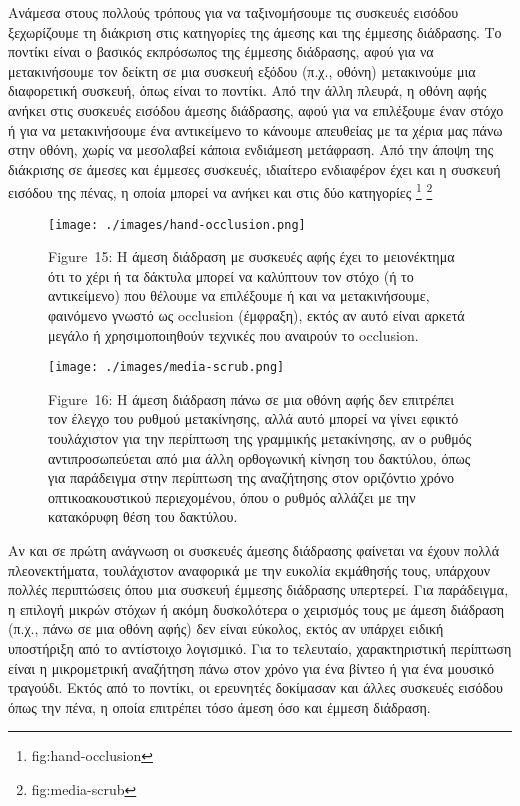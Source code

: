 \documentclass[
]{article}
\begin{document}
Ανάμεσα στους πολλούς τρόπους για να ταξινομήσουμε τις συσκευές εισόδου
ξεχωρίζουμε τη διάκριση στις κατηγορίες της άμεσης και της έμμεσης
διάδρασης. Το ποντίκι είναι ο βασικός εκπρόσωπος της έμμεσης διάδρασης,
αφού για να μετακινήσουμε τον δείκτη σε μια συσκευή εξόδου (π.χ., οθόνη)
μετακινούμε μια διαφορετική συσκευή, όπως είναι το ποντίκι. Από την άλλη
πλευρά, η οθόνη αφής ανήκει στις συσκευές εισόδου άμεσης διάδρασης, αφού
για να επιλέξουμε έναν στόχο ή για να μετακινήσουμε ένα αντικείμενο το
κάνουμε απευθείας με τα χέρια μας πάνω στην οθόνη, χωρίς να μεσολαβεί
κάποια ενδιάμεση μετάφραση. Από την άποψη της διάκρισης σε άμεσες και
έμμεσες συσκευές, ιδιαίτερο ενδιαφέρον έχει και η συσκευή εισόδου της
πένας, η οποία μπορεί να ανήκει και στις δύο κατηγορίες \footnote{fig:hand-occlusion}
\footnote{fig:media-scrub}

\leavevmode{}%
\begin{figure}
\hypertarget{fig:hand-occlusion}{%
\centering
\texttt{[image: ./images/hand-occlusion.png]}
\caption{Figure~15: Η άμεση διάδραση με συσκευές αφής έχει το
μειονέκτημα ότι το χέρι ή τα δάκτυλα μπορεί να καλύπτουν τον στόχο (ή το
αντικείμενο) που θέλουμε να επιλέξουμε ή και να μετακινήσουμε, φαινόμενο
γνωστό ως occlusion (έμφραξη), εκτός αν αυτό είναι αρκετά μεγάλο ή
χρησιμοποιηθούν τεχνικές που αναιρούν το
occlusion.}\label{fig:hand-occlusion}
}
\end{figure}

\leavevmode{}%
\begin{figure}
\hypertarget{fig:media-scrub}{%
\centering
\texttt{[image: ./images/media-scrub.png]}
\caption{Figure~16: Η άμεση διάδραση πάνω σε μια οθόνη αφής δεν
επιτρέπει τον έλεγχο του ρυθμού μετακίνησης, αλλά αυτό μπορεί να γίνει
εφικτό τουλάχιστον για την περίπτωση της γραμμικής μετακίνησης, αν ο
ρυθμός αντιπροσωπεύεται από μια άλλη ορθογωνική κίνηση του δακτύλου,
όπως για παράδειγμα στην περίπτωση της αναζήτησης στον οριζόντιο χρόνο
οπτικοακουστικού περιεχομένου, όπου ο ρυθμός αλλάζει με την κατακόρυφη
θέση του δακτύλου.}\label{fig:media-scrub}
}
\end{figure}

Αν και σε πρώτη ανάγνωση οι συσκευές άμεσης διάδρασης φαίνεται να έχουν
πολλά πλεονεκτήματα, τουλάχιστον αναφορικά με την ευκολία εκμάθησής
τους, υπάρχουν πολλές περιπτώσεις όπου μια συσκευή έμμεσης διάδρασης
υπερτερεί. Για παράδειγμα, η επιλογή μικρών στόχων ή ακόμη δυσκολότερα ο
χειρισμός τους με άμεση διάδραση (π.χ., πάνω σε μια οθόνη αφής) δεν
είναι εύκολος, εκτός αν υπάρχει ειδική υποστήριξη από το αντίστοιχο
λογισμικό. Για το τελευταίο, χαρακτηριστική περίπτωση είναι η
μικρομετρική αναζήτηση πάνω στον χρόνο για ένα βίντεο ή για ένα μουσικό
τραγούδι. Εκτός από το ποντίκι, οι ερευνητές δοκίμασαν και άλλες
συσκευές εισόδου όπως την πένα, η οποία επιτρέπει τόσο άμεση όσο και
έμμεση διάδραση.
\end{document}
